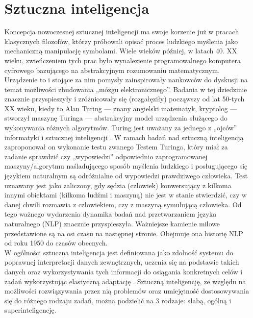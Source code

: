 \chapter{Sztuczna inteligencja}

Koncepcja nowoczesnej sztucznej inteligencji ma swoje korzenie już w pracach klasycznych filozofów, którzy próbowali opisać proces ludzkiego myślenia jako mechaniczną manipulację symbolami.
Wiele wieków później, w latach 40. XX wieku, zwieńczeniem tych prac było wynalezienie programowalnego komputera cyfrowego bazującego na abstrakcyjnym rozumowaniu matematycznym. Urządzenie to i stojące za nim pomysły zainspirowały naukowców do dyskusji na temat możliwości zbudowania „mózgu elektronicznego”.
Badania w tej dziedzinie znacznie przyspieszyły i zróżnicowały się (rozgałęziły) począwszy od lat 50-tych XX wieku, kiedy to Alan Turing --- znany angielski matematyk, kryptolog --- stworzył maszynę Turinga  ---  abstrakcyjny model urządzenia służącego do wykonywania różnych algorytmów. Turing jest uważany za jednego z „ojców” informatyki i sztucznej inteligencji \cite{turing}. W ramach badań nad sztuczną inteligencją zaproponował on wykonanie testu zwanego Testem Turinga, który miał za zadanie sprawdzić czy „wypowiedzi” odpowiednio zaprogramowanej maszyny/algorytmu naśladującego sposób myślenia ludzkiego i posługującego się językiem naturalnym są odróżnialne od wypowiedzi prawdziwego człowieka. Test uznawany jest jako zaliczony, gdy sędzia (człowiek) konwersujący z kilkoma innymi obiektami (kilkoma ludźmi i maszyną) nie jest w stanie stwierdzić, czy w danej chwili rozmawia z człowiekiem, czy z maszyną symulującą człowieka. Od tego ważnego wydarzenia dynamika badań nad przetwarzaniem języka naturalnego (NLP) znacznie przyspieszyła. Ważniejsze kamienie milowe przedstawione są na osi czasu na następnej stronie. Obejmuje ona historię NLP od roku 1950 do czasów obecnych. \\
\noindent W ogólności sztuczna inteligencja jest definiowana jako zdolność systemu do poprawnej interpretacji danych zewnętrznych, uczenia się na podstawie takich danych oraz wykorzystywania tych informacji do osiągania konkretnych celów i zadań wykorzystując elastyczną adaptację \cite{KAPLAN2019}. Sztuczną inteligencję, ze względu na możliwości rozwiązywania przez nią problemów oraz umiejętność dostosowywania się do różnego rodzaju zadań, można podzielić na 3 rodzaje: słabą, ogólną i superinteligencję. \\


